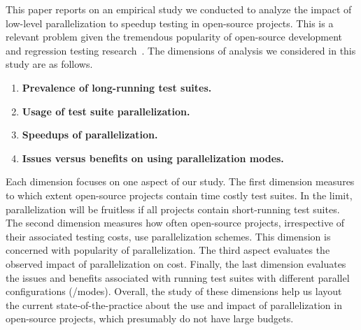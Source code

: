 This paper reports on an empirical study we conducted to analyze the
impact of low-level parallelization to speedup testing in open-source
projects.  This is a relevant problem given the tremendous popularity
of open-source development and regression testing
research~\cite{yoo-harman-stvr2012}.  The dimensions of analysis we
considered in this study are as follows.

\begin{enumerate}
\item \textbf{Prevalence of long-running test suites.}
\item \textbf{Usage of test suite parallelization.}  
\item \textbf{Speedups of parallelization.}
\item \textbf{Issues versus benefits on using parallelization modes.}
\end{enumerate}

Each dimension focuses on one aspect of our study.  The first
dimension measures to which extent open-source projects contain time
costly test suites.  In the limit, parallelization will be fruitless
if all projects contain short-running test suites. The second dimension
measures how often open-source projects, irrespective of their
associated testing costs, use parallelization schemes.  This dimension
is concerned with popularity of parallelization.  The third aspect
evaluates the observed impact of parallelization on cost.  Finally,
the last dimension evaluates the issues and benefits associated with
running test suites with different parallel configurations (/modes).
Overall, the study of these dimensions help us layout the current
state-of-the-practice about the use and impact of parallelization in open-source
projects, which presumably do not have large budgets.



